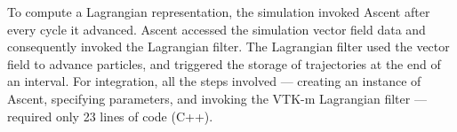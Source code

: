 To compute a Lagrangian representation, the simulation invoked Ascent after every cycle it advanced.
%
Ascent accessed the simulation vector field data and consequently invoked the Lagrangian filter. 
%
The Lagrangian filter used the vector field to advance particles, and triggered the storage of trajectories at the end of an interval.
%
%
For integration, all the steps involved --- creating an instance of Ascent, specifying parameters, and invoking the VTK-m Lagrangian filter --- required only 23 lines of code (C++). %
%
%
%
%
%
%

